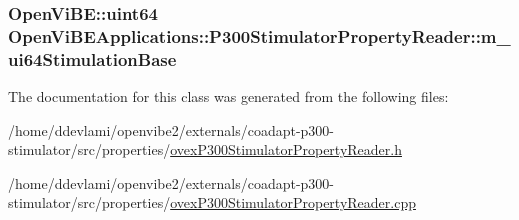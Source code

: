 \label{classOpenViBEApplications_1_1P300StimulatorPropertyReader_ae1e6b9329a5596f3d115588e916d1367}
\hypertarget{classOpenViBEApplications_1_1P300StimulatorPropertyReader_a55f615f0b7d7297231df65e3d73b3498}{
\subsubsection[{m\_\-ui64StimulationBase}]{\setlength{\rightskip}{0pt plus 5cm}OpenViBE::uint64 {\bf OpenViBEApplications::P300StimulatorPropertyReader::m\_\-ui64StimulationBase}}}
\label{classOpenViBEApplications_1_1P300StimulatorPropertyReader_a55f615f0b7d7297231df65e3d73b3498}


The documentation for this class was generated from the following files:\begin{DoxyCompactItemize}
\item 
/home/ddevlami/openvibe2/externals/coadapt-\/p300-\/stimulator/src/properties/\hyperlink{ovexP300StimulatorPropertyReader_8h}{ovexP300StimulatorPropertyReader.h}\item 
/home/ddevlami/openvibe2/externals/coadapt-\/p300-\/stimulator/src/properties/\hyperlink{ovexP300StimulatorPropertyReader_8cpp}{ovexP300StimulatorPropertyReader.cpp}\end{DoxyCompactItemize}
